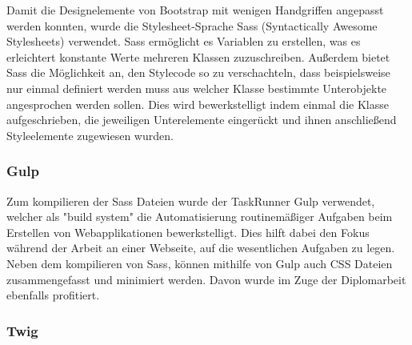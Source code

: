 Damit die Designelemente von Bootstrap mit wenigen Handgriffen angepasst werden konnten, wurde die Stylesheet-Sprache {Sass\cite{sass}} (Syntactically Awesome Stylesheets) verwendet. Sass ermöglicht es Variablen zu erstellen, was es erleichtert konstante Werte mehreren Klassen zuzuschreiben. Außerdem bietet Sass die Möglichkeit an, den Stylecode so zu verschachteln, dass beispielsweise nur einmal definiert werden muss aus welcher Klasse bestimmte Unterobjekte angesprochen werden sollen. Dies wird bewerkstelligt indem einmal die Klasse aufgeschrieben, die jeweiligen Unterelemente eingerückt und ihnen anschließend Styleelemente zugewiesen wurden.

    \subsubsection{Gulp}

Zum kompilieren der Sass Dateien wurde der TaskRunner {Gulp\cite{gulp}} verwendet, welcher als "build system" die Automatisierung routinemäßiger Aufgaben beim Erstellen von Webapplikationen bewerkstelligt. Dies hilft dabei den Fokus während der Arbeit an einer Webseite, auf die wesentlichen Aufgaben zu legen. Neben dem kompilieren von Sass, können mithilfe von Gulp auch CSS Dateien zusammengefasst und minimiert werden. Davon wurde im Zuge der Diplomarbeit ebenfalls profitiert.

    \subsubsection{Twig}

